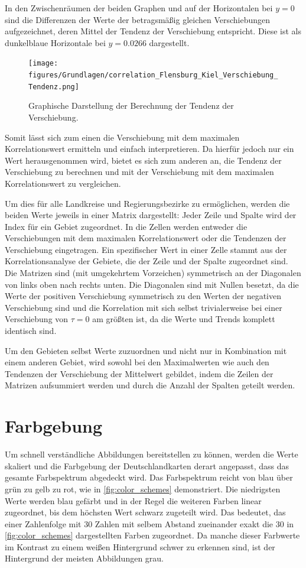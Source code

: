 In den Zwischenräumen der beiden Graphen und auf der Horizontalen bei $y=0$ sind die Differenzen der Werte der betragsmäßig gleichen Verschiebungen aufgezeichnet, deren Mittel der Tendenz der Verschiebung entspricht. Diese ist als dunkelblaue Horizontale bei $y=0.0266$ dargestellt.

\begin{figure}[H]
    \centering
    \texttt{[image: figures/Grundlagen/correlation\_Flensburg\_Kiel\_Verschiebung\_Tendenz.png]}
    \caption{Graphische Darstellung der Berechnung der Tendenz der Verschiebung.}
    \label{fig:Flensburg_Kiel_Verschiebung_Tendenz}
\end{figure}

Somit lässt sich zum einen die Verschiebung mit dem maximalen Korrelationswert ermitteln und einfach interpretieren.
Da hierfür jedoch nur ein Wert herausgenommen wird, bietet es sich zum anderen an, die Tendenz der Verschiebung zu berechnen und mit der Verschiebung mit dem maximalen Korrelationswert zu vergleichen.



Um dies für alle Landkreise und Regierungsbezirke zu ermöglichen, werden die beiden Werte jeweils in einer Matrix dargestellt: Jeder Zeile und Spalte wird der Index für ein Gebiet zugeordnet. In die Zellen werden entweder die Verschiebungen mit dem maximalen Korrelationswert oder die Tendenzen der Verschiebung eingetragen. Ein spezifischer Wert in einer Zelle stammt aus der Korrelationsanalyse der Gebiete, die der Zeile und der Spalte zugeordnet sind.
Die Matrizen sind (mit umgekehrtem Vorzeichen) symmetrisch an der Diagonalen von links oben nach rechts unten. Die Diagonalen sind mit Nullen besetzt, da die Werte der positiven Verschiebung symmetrisch zu den Werten der negativen Verschiebung sind und die Korrelation mit sich selbst trivialerweise bei einer Verschiebung von $\tau=0$ am größten ist, da die Werte und Trends komplett identisch sind.

Um den Gebieten selbst Werte zuzuordnen und nicht nur in Kombination mit einem anderen Gebiet, wird sowohl bei den Maximalwerten wie auch den Tendenzen der Verschiebung der Mittelwert gebildet, indem die Zeilen der Matrizen aufsummiert werden und durch die Anzahl der Spalten geteilt werden.
\section{Farbgebung}\label{sec:Grundlagen:Farbgebung}
Um schnell verständliche Abbildungen bereitstellen zu können, werden die Werte skaliert und die Farbgebung der Deutschlandkarten derart angepasst, dass das gesamte Farbspektrum abgedeckt wird. Das Farbspektrum reicht von blau über grün zu gelb zu rot, wie in \autoref{fig:color_schemes} demonstriert. Die niedrigsten Werte werden blau gefärbt und in der Regel die weiteren Farben linear zugeordnet, bis dem höchsten Wert schwarz zugeteilt wird.
Das bedeutet, das einer Zahlenfolge mit 30 Zahlen mit selbem Abstand zueinander exakt die 30 in \autoref{fig:color_schemes} dargestellten Farben zugeordnet.
Da manche dieser Farbwerte im Kontrast zu einem weißen Hintergrund schwer zu erkennen sind, ist der Hintergrund der meisten Abbildungen grau.

